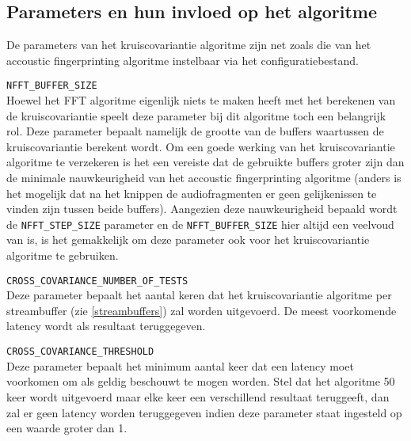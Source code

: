 \subsection{Parameters en hun invloed op het algoritme}

De parameters van het kruiscovariantie algoritme zijn net zoals die van het accoustic fingerprinting algoritme instelbaar via het configuratiebestand.

\begin{description}	
	\item\texttt{NFFT\_BUFFER\_SIZE} \hfill \\
	Hoewel het FFT algoritme eigenlijk niets te maken heeft met het berekenen van de kruiscovariantie speelt deze parameter bij dit algoritme toch een belangrijk rol. Deze parameter bepaalt namelijk de grootte van de buffers waartussen de kruiscovariantie berekent wordt. Om een goede werking van het kruiscovariantie algoritme te verzekeren is het een vereiste dat de gebruikte buffers groter zijn dan de minimale nauwkeurigheid van het accoustic fingerprinting algoritme (anders is het mogelijk dat na het knippen de audiofragmenten er geen gelijkenissen te vinden zijn tussen beide buffers). Aangezien deze nauwkeurigheid bepaald wordt de \texttt{NFFT\_STEP\_SIZE} parameter en de \texttt{NFFT\_BUFFER\_SIZE} hier altijd een veelvoud van is, is het gemakkelijk om deze parameter ook voor het kruiscovariantie algoritme te gebruiken.
	
	\item\texttt{CROSS\_COVARIANCE\_NUMBER\_OF\_TESTS} \hfill \\
	Deze parameter bepaalt het aantal keren dat het kruiscovariantie algoritme per streambuffer (zie \ref{streambuffers}) zal worden uitgevoerd. De meest voorkomende latency wordt als resultaat teruggegeven.
	
	\item\texttt{CROSS\_COVARIANCE\_THRESHOLD} \hfill \\
	Deze parameter bepaalt het minimum aantal keer dat een latency moet voorkomen om als geldig beschouwt te mogen worden.	Stel dat het algoritme 50 keer wordt uitgevoerd maar elke keer een verschillend resultaat teruggeeft, dan zal er geen latency worden teruggegeven indien deze parameter staat ingesteld op een waarde groter dan 1.
	
\end{description}

